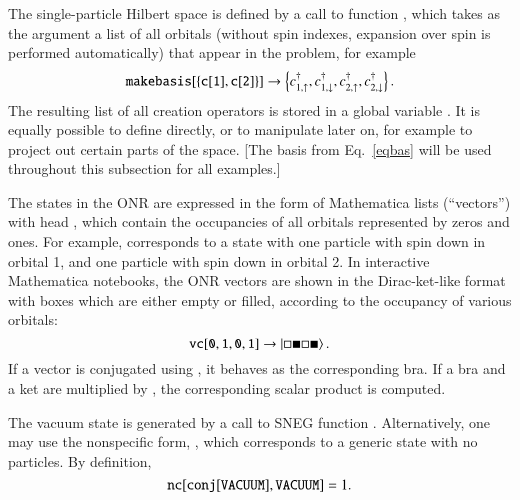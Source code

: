 \documentclass[3p,number,preprint]{elsarticle}
\begin{document}
The single-particle Hilbert space is defined by a call to function
, which takes as the argument a list of all orbitals
(without spin indexes, expansion over spin is performed automatically)
that appear in the problem, for example
%
\begin{equation}
\label{eqbas}
{\tt makebasis[\{c[1],c[2]\}]} \to \left\{ c^\dag_{1,\uparrow},
c^\dag_{1,\downarrow}, c^\dag_{2,\uparrow}, c^\dag_{2,\downarrow}
\right\}.
\end{equation}
%
The resulting list of all creation operators is stored in a global
variable . It is equally possible to define 
directly, or to manipulate  later on, for example to
project out certain parts of the space. [The basis from
Eq.~\eqref{eqbas} will be used throughout this subsection for all
examples.]

The states in the ONR are expressed in the form of Mathematica lists
(``vectors'') with head , which contain the occupancies of all
orbitals represented by zeros and ones. For example,
corresponds to a state with one particle with spin down in orbital 1,
and one particle with spin down in orbital 2. In interactive
Mathematica notebooks, the ONR vectors are shown in the Dirac-ket-like
format with boxes which are either empty or filled, according to the
occupancy of various orbitals:
%
\begin{equation}
{\tt vc[0,1,0,1]} \to \left| \square \blacksquare \square \blacksquare \right\rangle.
\end{equation}
%
If a vector is conjugated using , it behaves as the
corresponding bra. If a bra and a ket are multiplied by , the
corresponding scalar product is computed.

The vacuum state is generated by a call to SNEG function .
Alternatively, one may use the nonspecific form, , which
corresponds to a generic state with no particles. By definition,
%
\begin{equation}
{\tt nc[conj[VACUUM], VACUUM]} = 1.
\end{equation}
\end{document}
